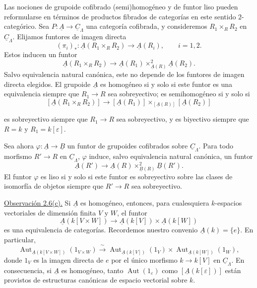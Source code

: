 Las nociones de grupoide cofibrado (semi)homogéneo y de funtor liso
pueden reformularse en términos de productos fibrados de categorías en
este sentido $2$-categórico. Sea
$P:\underline A\longrightarrow\underline C_\Lambda$ una categoría
cofibrada, y consideremos $R_1\times_RR_2$ en
$\underline C_\Lambda$. Elijamos funtores de imagen directa
\[
 (\pi_i)_*:\underline A(R_1\times_RR_2)
 \longrightarrow\underline A(R_i),\qquad i=1,2.
\]
Estos inducen un funtor
\[
 \underline A(R_1\times_RR_2)\longrightarrow
 \underline A(R_1)\times^2_{\underline A(R)}\underline A(R_2).
\]
Salvo equivalencia natural canónica, este no depende de los funtores
de imagen directa elegidos. El grupoide $\underline A$ es homogéneo si
y solo si este funtor es una equivalencia siempre que
$R_1\longrightarrow R$ sea sobreyectivo; es semihomogéneo si y solo si
\[
 [\underline A(R_1\times_RR_2)]\longrightarrow
 [\underline A(R_1)]
 \times_{[\underline A(R)]}[\underline A(R_2)]
\]


es sobreyectivo siempre que $R_1\longrightarrow R$ sea sobreyectivo,
y es biyectivo siempre que $R=k$ y $R_1=k[\varepsilon]$.

Sea ahora $\varphi:\underline A\longrightarrow\underline B$ un
funtor de grupoides cofibrados sobre $\underline C_\Lambda$. Para todo
morfismo $R'\longrightarrow R$ en $\underline C_\Lambda$,
$\varphi$ induce, salvo equivalencia natural canónica, un funtor
\[
 \underline A(R')\longrightarrow
 \underline A(R)\times^2_{\underline B(R)}\underline B(R').
\]
El funtor $\varphi$ es liso si y solo si este funtor es sobreyectivo
sobre las clases de isomorfía de objetos siempre que
$R'\longrightarrow R$ sea sobreyectivo.

\underline{Observación 2.6(c).} Si $\underline A$ es homogéneo,
entonces, para cualesquiera $k$-espacios vectoriales de dimensión
finita $V$ y $W$, el funtor
\[
 \underline A(k[V\times W])\longrightarrow
 \underline A(k[V])\times\underline A(k[W])
\]
es una equivalencia de categorías. Recordemos nuestro convenio
$\underline A(k)=\{e\}$. En particular,
\[
 \operatorname{Aut}_{\underline A(k[V\times W])}(1_{V\times W})
 \xrightarrow{\ \sim\ }
 \operatorname{Aut}_{\underline A(k[V])}(1_V)
 \times
 \operatorname{Aut}_{\underline A(k[W])}(1_W),
\]
donde $1_V$ es la imagen directa de $e$ por el único morfismo
$k\longrightarrow k[V]$ en $\underline C_\Lambda$. En consecuencia,
si $\underline A$ es homogéneo, tanto
$\operatorname{Aut}(1_\varepsilon)$ como
$[\underline A(k[\varepsilon])]$ están provistos de estructuras
canónicas de espacio vectorial sobre $k$.

